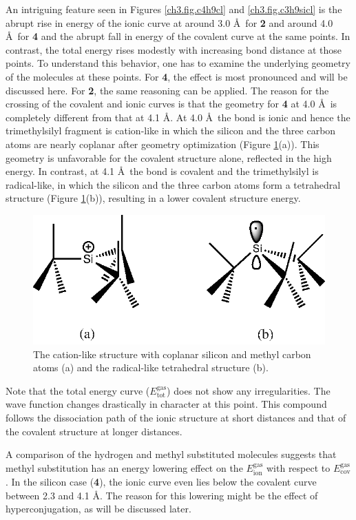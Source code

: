 An intriguing feature seen in Figures \ref{ch3.fig.c4h9cl} and \ref{ch3.fig.c3h9sicl} is the abrupt rise in energy of the ionic curve at around 3.0 \AA\ for \textbf{2} and around 4.0 \AA\ for \textbf{4} and the abrupt fall in energy of the covalent curve at the same points. In contrast, the total energy rises modestly with increasing bond distance at those points. To understand this behavior, one has to examine the underlying geometry of the molecules at these points. For \textbf{4}, the effect is most pronounced and will be discussed here. For \textbf{2}, the same reasoning can be applied. The reason for the crossing of the covalent and ionic curves is that the geometry for \textbf{4} at 4.0 \AA\ is completely different from that at 4.1 \AA. At 4.0 \AA\ the bond is ionic and hence the trimethylsilyl fragment is cation-like in which the silicon and the three carbon atoms are nearly coplanar after geometry optimization (Figure \ref{ch3.fig.crossing}(a)). This geometry is unfavorable for the covalent structure alone, reflected in the high energy.  In contrast, at 4.1 \AA\  the bond is covalent and the trimethylsilyl is radical-like, in which the silicon and the three carbon atoms form a tetrahedral structure (Figure \ref{ch3.fig.crossing}(b)), resulting in a lower covalent structure energy. 
\begin{figure}[hbtp]
\center
\includegraphics[scale=1.0]{dissociation/figures/crossing.eps}
\caption{The cation-like structure with coplanar silicon and methyl carbon atoms (a) and the radical-like tetrahedral structure (b).}
\label{ch3.fig.crossing}
\end{figure}
Note that the total energy curve ($E_\mathrm{tot}^\mathrm{gas}$) does not show any irregularities.  The wave function changes drastically in character at this point. This compound follows the dissociation path of the ionic structure at short distances and that of the covalent structure at longer distances. 

A comparison of the hydrogen and methyl substituted molecules suggests that methyl substitution has an energy lowering effect on the $E_\mathrm{ion}^\mathrm{gas}$ with respect to $E_\mathrm{cov}^\mathrm{gas}$. In the silicon case (\textbf{4}), the ionic curve even lies below the covalent curve between 2.3 and 4.1 \AA. The reason for this lowering might be the effect of hyperconjugation, as will be discussed later.

